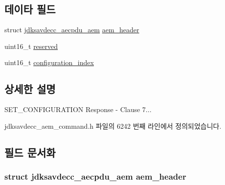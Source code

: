 \subsection*{데이타 필드}
\begin{DoxyCompactItemize}
\item 
struct \hyperlink{structjdksavdecc__aecpdu__aem}{jdksavdecc\+\_\+aecpdu\+\_\+aem} \hyperlink{structjdksavdecc__aem__command__get__configuration__response_ae1e77ccb75ff5021ad923221eab38294}{aem\+\_\+header}
\item 
uint16\+\_\+t \hyperlink{structjdksavdecc__aem__command__get__configuration__response_a5a6ed8c04a3db86066924b1a1bf4dad3}{reserved}
\item 
uint16\+\_\+t \hyperlink{structjdksavdecc__aem__command__get__configuration__response_afaad1bd7c66f9611e134d8c5ce98f444}{configuration\+\_\+index}
\end{DoxyCompactItemize}


\subsection{상세한 설명}
S\+E\+T\+\_\+\+C\+O\+N\+F\+I\+G\+U\+R\+A\+T\+I\+ON Response -\/ Clause 7... 

jdksavdecc\+\_\+aem\+\_\+command.\+h 파일의 6242 번째 라인에서 정의되었습니다.



\subsection{필드 문서화}
\subsubsection[{\texorpdfstring{aem\+\_\+header}{aem_header}}]{\setlength{\rightskip}{0pt plus 5cm}struct {\bf jdksavdecc\+\_\+aecpdu\+\_\+aem} aem\+\_\+header}\hypertarget{structjdksavdecc__aem__command__get__configuration__response_ae1e77ccb75ff5021ad923221eab38294}{}\label{structjdksavdecc__aem__command__get__configuration__response_ae1e77ccb75ff5021ad923221eab38294}


